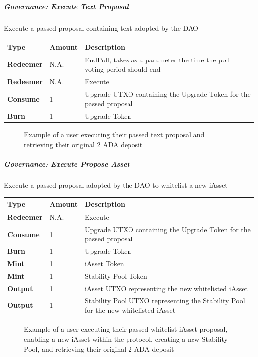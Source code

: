 \documentclass{article}
\begin{document}
\begin{sloppypar}
\hypertarget{governance-execute-text-proposal}{%
\subparagraph{Governance: Execute Text
Proposal}\label{governance-execute-text-proposal}}

Execute a passed proposal containing text adopted by the DAO

\begin{tabularx}{\linewidth}{l|l|L}
\toprule
\textbf{Type} & \textbf{Amount} & \textbf{Description}
\tabularnewline
\midrule
\endhead
\textbf{Redeemer} & N.A. & EndPoll, takes as a parameter the time the
poll voting period should end
\tabularnewline
\midrule
\textbf{Redeemer} & N.A. & Execute
\tabularnewline
\midrule
\textbf{Consume} & 1 & Upgrade UTXO containing the Upgrade Token for the
passed proposal
\tabularnewline
\midrule
\textbf{Burn} & 1 & Upgrade Token
\tabularnewline
\bottomrule
\end{tabularx}

\hypertarget{governance-execute-text-proposal-figure}{%
\begin{figure}[htbp]
\centering

\caption{Example of a user executing their passed text proposal
and retrieving their original 2 ADA deposit}
\label{governance-execute-text-proposal-figure}
\end{figure}}

\hypertarget{governance-execute-propose-asset}{%
\subparagraph{Governance: Execute Propose
Asset}\label{governance-execute-propose-asset}}

Execute a passed proposal adopted by the DAO to whitelist a new iAsset

\begin{tabularx}{\linewidth}{l|l|L}
\toprule
\textbf{Type} & \textbf{Amount} & \textbf{Description}
\tabularnewline
\midrule
\endhead
\textbf{Redeemer} & N.A. & Execute
\tabularnewline
\midrule
\textbf{Consume} & 1 & Upgrade UTXO containing the Upgrade Token for the
passed proposal
\tabularnewline
\midrule
\textbf{Burn} & 1 & Upgrade Token
\tabularnewline
\midrule
\textbf{Mint} & 1 & iAsset Token
\tabularnewline
\midrule
\textbf{Mint} & 1 & Stability Pool Token
\tabularnewline
\midrule
\textbf{Output} & 1 & iAsset UTXO representing the new whitelisted
iAsset
\tabularnewline
\midrule
\textbf{Output} & 1 & Stability Pool UTXO representing the Stability
Pool for the new whitelisted iAsset
\tabularnewline
\bottomrule
\end{tabularx}

\hypertarget{governance-execute-propose-asset-figure}{%
\begin{figure}[htbp]
\centering

\caption{Example of a user executing their passed whitelist iAsset
proposal, enabling a new iAsset within the protocol, creating a
new Stability Pool, and retrieving their original 2 ADA deposit}
\label{governance-execute-propose-asset-figure}
\end{figure}}


\end{sloppypar}
\end{document}
